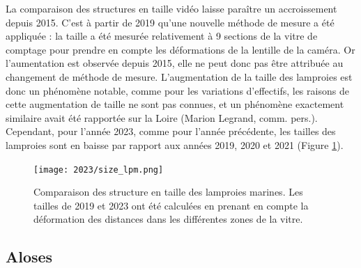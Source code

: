 \documentclass[11pt,twocolumn,titlepage,twoside]{article}\usepackage[]{graphicx}\usepackage[]{color}
\begin{document}
La comparaison des structures en taille vidéo laisse
paraître un accroissement depuis 2015. C’est à partir de 2019 qu’une nouvelle méthode de
mesure a été appliquée : la taille a été mesurée relativement à 9 sections de la vitre de comptage pour
prendre en compte les déformations de la lentille
de la caméra. Or l’aumentation est observée depuis
2015, elle ne peut donc pas être attribuée au changement de méthode de mesure. L’augmentation de la
taille des lamproies est donc un phénomène notable,
comme pour les variations d’effectifs, les raisons de
cette augmentation de taille ne sont pas connues, et un phénomène exactement
similaire avait été rapportée sur la Loire (Marion Legrand, comm. pers.).
Cependant, pour l'année 2023, comme pour l'année précédente, les tailles des
lamproies sont en baisse par rapport aux années 2019, 2020 et 2021 (Figure \ref{size_lpm}).

\begin{figure}[htpb]
\centering
\texttt{[image: 2023/size\_lpm.png]} 
\caption{Comparaison des structure en taille des lamproies marines. Les tailles
de 2019 et 2023 ont été calculées en prenant en compte la déformation des distances dans les
différentes zones de la vitre.}
\label{size_lpm}
\end{figure}












\clearpage
\subsection{Aloses}
\end{document}
